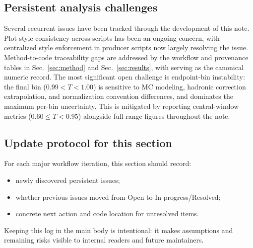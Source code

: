 \subsection{Persistent analysis challenges}

Several recurrent issues have been tracked through the development of this note. Plot-style consistency across scripts has been an ongoing concern, with centralized style enforcement in producer scripts now largely resolving the issue. Method-to-code traceability gaps are addressed by the workflow and provenance tables in Sec.~\ref{sec:method} and Sec.~\ref{sec:results}, with  serving as the canonical numeric record. The most significant open challenge is endpoint-bin instability: the final bin ($0.99<T<1.00$) is sensitive to MC modeling, hadronic correction extrapolation, and normalization convention differences, and dominates the maximum per-bin uncertainty. This is mitigated by reporting central-window metrics ($0.60\le T<0.95$) alongside full-range figures throughout the note.

\subsection{Update protocol for this section}

For each major workflow iteration, this section should record:
\begin{itemize}
\item newly discovered persistent issues;
\item whether previous issues moved from Open to In progress/Resolved;
\item concrete next action and code location for unresolved items.
\end{itemize}

Keeping this log in the main body is intentional: it makes assumptions and remaining risks visible to internal readers and future maintainers.
